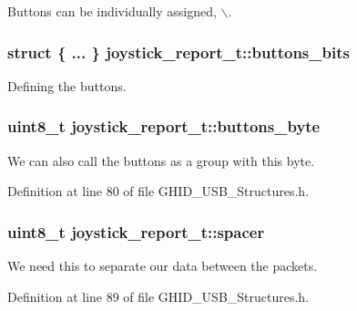 \-Buttons can be individually assigned, $\backslash$. 

\hypertarget{structjoystick__report__t_aade536be4f91757b2ecd075fcf2f0a3d}{
\subsubsection[{buttons\-\_\-bits}]{\setlength{\rightskip}{0pt plus 5cm}struct \{ ... \}  {\bf joystick\-\_\-report\-\_\-t\-::buttons\-\_\-bits}}}\label{structjoystick__report__t_aade536be4f91757b2ecd075fcf2f0a3d}


\-Defining the buttons. 

\hypertarget{structjoystick__report__t_a1b9fb1806c80f76292cba7c719ac6c6c}{
\subsubsection[{buttons\-\_\-byte}]{\setlength{\rightskip}{0pt plus 5cm}uint8\-\_\-t {\bf joystick\-\_\-report\-\_\-t\-::buttons\-\_\-byte}}}\label{structjoystick__report__t_a1b9fb1806c80f76292cba7c719ac6c6c}


\-We can also call the buttons as a group with this byte. 



\-Definition at line 80 of file \-G\-H\-I\-D\-\_\-\-U\-S\-B\-\_\-\-Structures.\-h.

\hypertarget{structjoystick__report__t_a4b7eb53cb199dc64ceea758f0baacbcc}{
\subsubsection[{spacer}]{\setlength{\rightskip}{0pt plus 5cm}uint8\-\_\-t {\bf joystick\-\_\-report\-\_\-t\-::spacer}}}\label{structjoystick__report__t_a4b7eb53cb199dc64ceea758f0baacbcc}


\-We need this to separate our data between the packets. 



\-Definition at line 89 of file \-G\-H\-I\-D\-\_\-\-U\-S\-B\-\_\-\-Structures.\-h.

